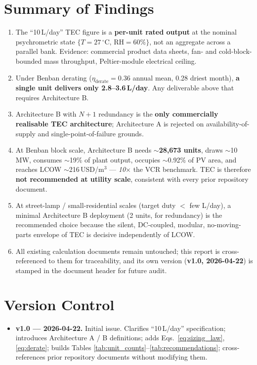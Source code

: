 \documentclass[11pt,a4paper]{article}
\newcommand{\SI}[2]{#1\,\ensuremath{\mathrm{#2}}}
\providecommand{\celsius}{^{\circ}\mathrm{C}}
\begin{document}
\section{Summary of Findings}
\label{sec:summary}
\begin{enumerate}[leftmargin=*]
  \item The ``10\,L/day'' TEC figure is a \textbf{per-unit rated output} at the nominal psychrometric state $\{T{=}\SI{27}{\celsius},\,\mathrm{RH}{=}60\%\}$, not an aggregate across a parallel bank. Evidence: commercial product data sheets, fan- and cold-block-bounded mass throughput, Peltier-module electrical ceiling.
  \item Under Benban derating ($\eta_{\mathrm{derate}}{=}0.36$ annual mean, 0.28 driest month), \textbf{a single unit delivers only 2.8--3.6\,L/day}. Any deliverable above that requires Architecture B.
  \item Architecture B with $N{+}1$ redundancy is the \textbf{only commercially realisable TEC architecture}; Architecture A is rejected on availability-of-supply and single-point-of-failure grounds.
  \item At Benban block scale, Architecture B needs \textbf{$\sim$28{,}673 units}, draws $\sim$10\,MW, consumes $\sim$19\% of plant output, occupies $\sim$0.92\% of PV area, and reaches LCOW $\sim$216\,USD/m$^3$ --- \emph{10$\times$} the VCR benchmark. TEC is therefore \textbf{not recommended at utility scale}, consistent with every prior repository document.
  \item At street-lamp / small-residential scales (target duty $<$ few L/day), a minimal Architecture B deployment (2 units, for redundancy) is the recommended choice because the silent, DC-coupled, modular, no-moving-parts envelope of TEC is decisive independently of LCOW.
  \item All existing calculation documents remain untouched; this report is cross-referenced to them for traceability, and its own version (\textbf{v1.0, 2026-04-22}) is stamped in the document header for future audit.
\end{enumerate}

\section*{Version Control}
\begin{itemize}[leftmargin=*]
  \item \textbf{v1.0 --- 2026-04-22.} Initial issue. Clarifies ``10\,L/day'' specification; introduces Architecture A / B definitions; adds Eqs.~\ref{eq:sizing_law}, \ref{eq:derate}; builds Tables \ref{tab:unit_counts}--\ref{tab:recommendations}; cross-references prior repository documents without modifying them.
\end{itemize}
\end{document}
